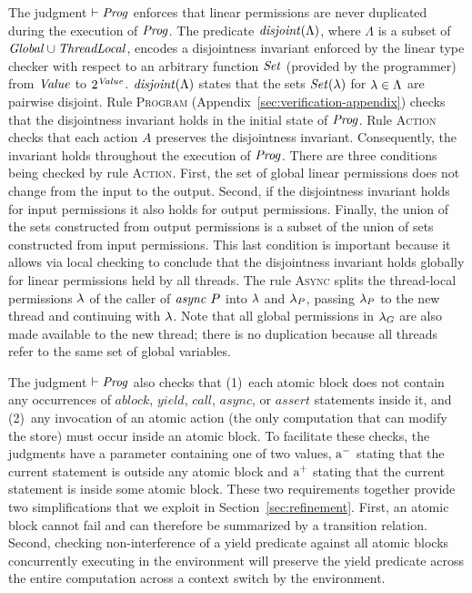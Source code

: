 The judgment $\vdash \mathit{Prog}$ enforces that linear permissions are never duplicated during the 
execution of $\mathit{Prog}$.
The predicate $\mathit{disjoint}(\Lambda)$, where $\Lambda$ is a subset of $\mathit{Global} \cup \mathit{ThreadLocal}$,
encodes a disjointness invariant enforced by the linear type checker
with respect to an arbitrary function $\mathit{Set}$ (provided by the programmer) from $\mathit{Value}$ to $2^{\mathit{Value}}$.
$\mathit{disjoint}(\Lambda)$ states that the sets $\mathit{Set}(\lambda)$ for $\lambda \in \Lambda$ are pairwise disjoint.
Rule \textsc{Program} (Appendix~\ref{sec:verification-appendix}) checks that the disjointness invariant holds in the initial state of $\mathit{Prog}$.
Rule \textsc{Action} checks that each action $A$ preserves the disjointness invariant.
Consequently, the invariant holds throughout the execution of $\mathit{Prog}$.
There are three conditions being checked by rule \textsc{Action}.
First, the set of global linear permissions does not change from the input to the output.
Second, if the disjointness invariant holds for input permissions it also holds for output permissions.
Finally, the union of the sets constructed from output permissions is a subset of the union of sets
constructed from input permissions.  
This last condition is important because it allows via local checking to conclude that the disjointness invariant holds globally
for linear permissions held by all threads.
The rule \textsc{Async} splits the thread-local permissions $\lambda$ of the caller of $\mathit{async}\ P$ into $\lambda$ 
and $\lambda_P$, passing $\lambda_P$ to the new thread and continuing with $\lambda$.
Note that all global permissions in $\lambda_G$ are also made available to the new thread;
there is no duplication because all threads refer to the same set of global variables.

The judgment $\vdash \mathit{Prog}$ also checks that 
(1)~each atomic block does not contain any occurrences of $\mathit{ablock}$, $\mathit{yield}$, $\mathit{call}$, $\mathit{async}$, or $\mathit{assert}$ statements inside it, and
(2)~any invocation of an atomic action (the only computation that can modify the store) must occur inside an atomic block.
To facilitate these checks, the judgments have a parameter containing one of two values,
$\mathrm{a^-}$ stating that the current statement is outside any atomic block and
$\mathrm{a^+}$ stating that the current statement is inside some atomic block.
These two requirements together provide two simplifications that we exploit in Section~\ref{sec:refinement}.
First, an atomic block cannot fail and can therefore be summarized by a transition relation.
Second, checking non-interference of a yield predicate against all atomic blocks concurrently executing 
in the environment will preserve the yield predicate across the entire computation across a context switch by the environment.

